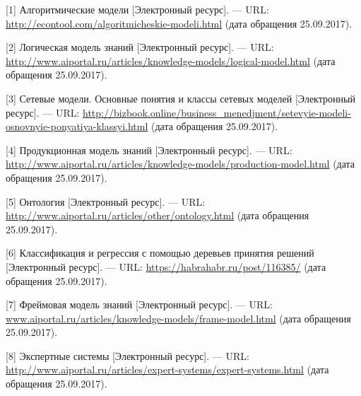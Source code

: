 \documentclass[14pt,a4paper,report]{report}
\begin{document}


\begin{flushleft}

[1] Алгоритмические модели [Электронный ресурс]. — URL: \href{http://econtool.com/algoritmicheskie-modeli.html}{http://econtool.com/algoritmicheskie-modeli.html} (дата обращения 25.09.2017). \linebreak

[2] Логическая модель знаний [Электронный ресурс]. — URL: \href{http://www.aiportal.ru/articles/knowledge-models/logical-model.html}{http://www.aiportal.ru/articles/knowledge-models/logical-model.html} (дата обращения 25.09.2017). \linebreak

[3] Сетевые модели. Основные понятия и классы сетевых моделей [Электронный ресурс]. — URL: \href{http://bizbook.online/business_menedjment/setevyie-modeli-osnovnyie-ponyatiya-klassyi.html}{http://bizbook.online/business\_menedjment/setevyie-modeli-osnovnyie-ponyatiya-klassyi.html} (дата обращения 25.09.2017).

[4] Продукционная модель знаний [Электронный ресурс]. — URL: \href{http://www.aiportal.ru/articles/knowledge-models/production-model.html}{http://www.aiportal.ru/articles/knowledge-models/production-model.html} (дата обращения 25.09.2017). \linebreak

[5] Онтология [Электронный ресурс]. — URL: \href{http://www.aiportal.ru/articles/other/ontology.html}{http://www.aiportal.ru/articles/other/ontology.html} (дата обращения 25.09.2017). \linebreak

[6] Классификация и регрессия с помощью деревьев принятия решений [Электронный ресурс]. — URL: \href{https://habrahabr.ru/post/116385/}{https://habrahabr.ru/post/116385/} (дата обращения 25.09.2017). \linebreak

[7] Фреймовая модель знаний [Электронный ресурс]. — URL: \href{www.aiportal.ru/articles/knowledge-models/frame-model.html}{www.aiportal.ru/articles/knowledge-models/frame-model.html} (дата обращения 25.09.2017). \linebreak

[8] Экспертные системы [Электронный ресурс]. — URL: \href{http://www.aiportal.ru/articles/expert-systems/expert-systems.html}{http://www.aiportal.ru/articles/expert-systems/expert-systems.html} (дата обращения 25.09.2017). \linebreak


\end{flushleft}
\end{document}
